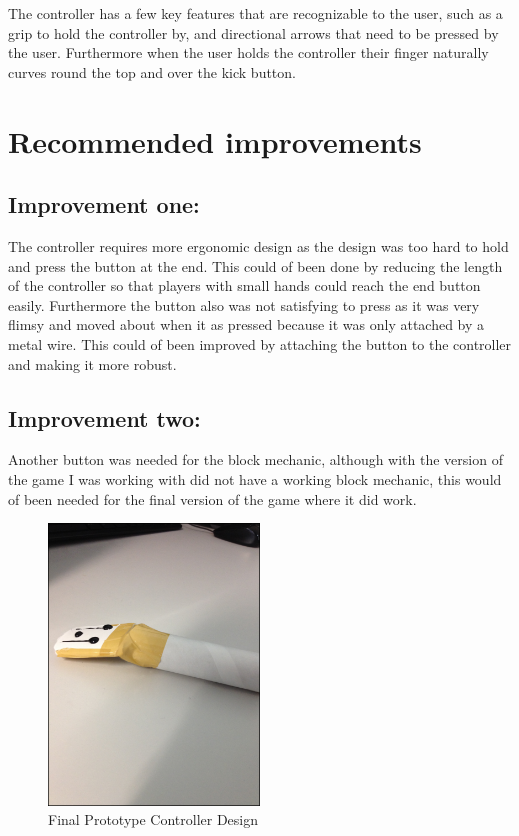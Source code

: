 \documentclass{scrartcl}
\begin{document}
The controller has a few key features that are recognizable to the user, such as a grip to hold the controller by, and directional arrows that need to be pressed by the user. Furthermore when the user holds the controller their finger naturally curves round the top and over the kick button.

\section{Recommended improvements}

\subsection{Improvement one:}
The controller requires more ergonomic design as the design was too hard to hold and press the button at the end. This could of been done by reducing the length of the controller so that players with small hands could reach the end button easily. Furthermore the button also was not satisfying to press as it was very flimsy and moved about when it as pressed because it was only attached by a metal wire. This could of been improved by attaching the button to the controller and making it more robust.

\subsection{Improvement two:}
Another button was needed for the block mechanic, although with the version of the game I was working with did not have a working block mechanic, this would of been needed for the final version of the game where it did work.


\begin{figure}[h]
\centering
\includegraphics[width=0.5\textwidth]{Final-Design}
\caption{Final Prototype Controller Design}
\end{figure}
\end{document}
